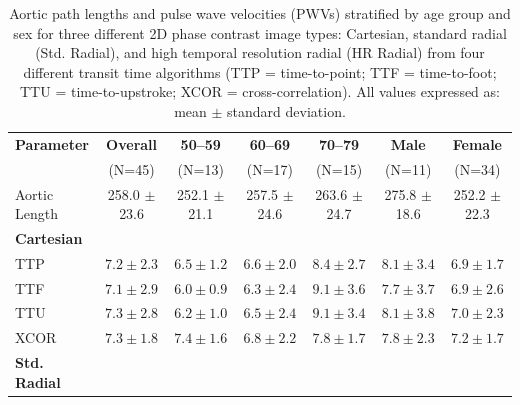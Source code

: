 \begin{table}[ht]
    \centering
    \caption[Aortic distances and pulse wave velocities]{Aortic path lengths and pulse wave velocities (PWVs) stratified by age group and sex for three different 2D phase contrast image types: Cartesian, standard radial (Std. Radial), and high temporal resolution radial (HR Radial) from four different transit time algorithms (TTP = time-to-point; TTF = time-to-foot; TTU = time-to-upstroke; XCOR = cross-correlation). All values expressed as: mean $\pm$ standard deviation.}\label{tab:life_pwvs}
    \footnotesize
    \ifFinal{}
    \fi
    \vspace{0.25cm}
    \begin{tabularx}{\textwidth}{lcccccc}
    \toprule
    \textbf{Parameter} & \textbf{Overall} & \textbf{50--59} & \textbf{60--69} & \textbf{70--79} & \textbf{Male} & \textbf{Female}  \\
    & (N=45) & (N=13) & (N=17) & (N=15) & (N=11) & (N=34) \\

    \midrule
    Aortic Length & 258.0 $\pm$ 23.6 & 252.1 $\pm$ 21.1 & 257.5 $\pm$ 24.6 & 263.6 $\pm$ 24.7 & 275.8 $\pm$ 18.6 & 252.2 $\pm$ 22.3 \\

    \midrule
    \textbf{Cartesian} & \phantom{0} & \phantom{0} & \phantom{0} & \phantom{0} & \phantom{0} & \phantom{0} \\

    TTP  & $7.2 \pm  2.3$ & $6.5 \pm  1.2$ & $6.6 \pm  2.0$ & $8.4 \pm  2.7$ & $8.1 \pm  3.4$ & $6.9 \pm  1.7$ \\
    TTF  & $7.1 \pm  2.9$ & $6.0 \pm  0.9$ & $6.3 \pm  2.4$ & $9.1 \pm  3.6$ & $7.7 \pm  3.7$ & $6.9 \pm  2.6$ \\
    TTU  & $7.3 \pm  2.8$ & $6.2 \pm  1.0$ & $6.5 \pm  2.4$ & $9.1 \pm  3.4$ & $8.1 \pm  3.8$ & $7.0 \pm  2.3$ \\
    XCOR & $7.3 \pm  1.8$ & $7.4 \pm  1.6$ & $6.8 \pm  2.2$ & $7.8 \pm  1.7$ & $7.8 \pm  2.3$ & $7.2 \pm  1.7$ \\

    \midrule
    \textbf{Std. Radial} & \phantom{0} & \phantom{0} & \phantom{0} & \phantom{0} & \phantom{0} & \phantom{0} \\


\end{tabularx}
\end{table}
